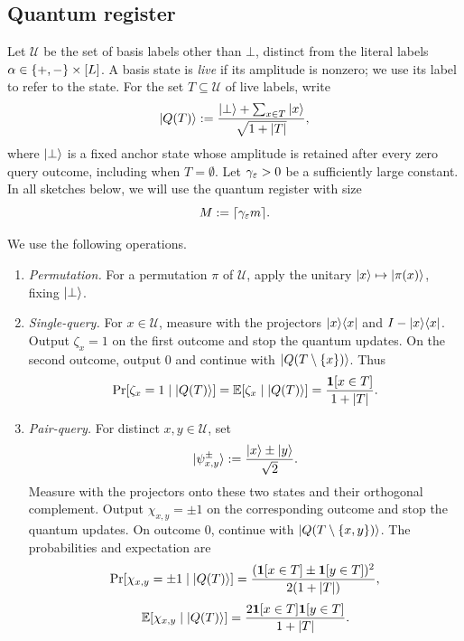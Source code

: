 \subsection{Quantum register}

Let $\mathcal U$ be the set of basis labels other than $\bot$, distinct from the literal labels $\alpha\in\{+,-\}\times[L]$.
A basis state is \textit{live} if its amplitude is nonzero; we use its label to refer to the state.
For the set $T\subseteq\mathcal U$ of live labels, write
\[
  \ket{Q(T)}:=\frac{\ket{\bot}+\sum_{x\in T}\ket{x}}{\sqrt{1+|T|}},
\]
where $\ket{\bot}$ is a fixed anchor state whose amplitude is retained after every zero query outcome, including when $T=\emptyset$.
Let $\gamma_\varepsilon>0$ be a sufficiently large constant. In all sketches below, we will use the quantum register with size $$M:=\lceil  \gamma_{\varepsilon} m \rceil.$$ 

We use the following operations.
\begin{enumerate}[leftmargin=1.5em,itemsep=0.3em,topsep=0.3em]
  \item \emph{Permutation.} For a permutation $\pi$ of $\mathcal U$, apply the unitary
  $\ket{x}\mapsto\ket{\pi(x)}$, fixing $\ket{\bot}$.

  \item \emph{Single-query.} For $x\in\mathcal U$, measure with the projectors
  $\ket{x}\!\bra{x}$ and $I-\ket{x}\!\bra{x}$.
  Output $\zeta_x=1$ on the first outcome and stop the quantum updates.
  On the second outcome, output $0$ and continue with $\ket{Q(T\setminus\{x\})}$.
  Thus
  \begin{equation}\label{eq:single-query-mean}
    \Pr[\zeta_x=1\mid\left|Q(T)\right\rangle]
    =\mathbb E[\zeta_x\mid\left|Q(T)\right\rangle]
    =\frac{\mathbf 1[x\in T]}{1+|T|}.
  \end{equation}

  \item \emph{Pair-query.} For distinct $x,y\in\mathcal U$, set
  \[
    \ket{\psi^{\pm}_{x,y}}:=\frac{\ket{x}\pm\ket{y}}{\sqrt2}.
  \]
  Measure with the projectors onto these two states and their orthogonal complement.
  Output $\chi_{x,y}=\pm1$ on the corresponding outcome and stop the quantum updates.
  On outcome $0$, continue with $\ket{Q(T\setminus\{x,y\})}$.
  The probabilities and expectation are
  \[
    \Pr[\chi_{x,y}=\pm1\mid\left|Q(T)\right\rangle]
    =\frac{(\mathbf 1[x\in T]\pm\mathbf 1[y\in T])^2}{2(1+|T|)},
  \]
  \begin{equation}\label{eq:pair-query-mean}
    \mathbb E[\chi_{x,y}\mid\left|Q(T)\right\rangle]
    =\frac{2\mathbf 1[x\in T]\mathbf 1[y\in T]}{1+|T|}.
  \end{equation}
\end{enumerate}
